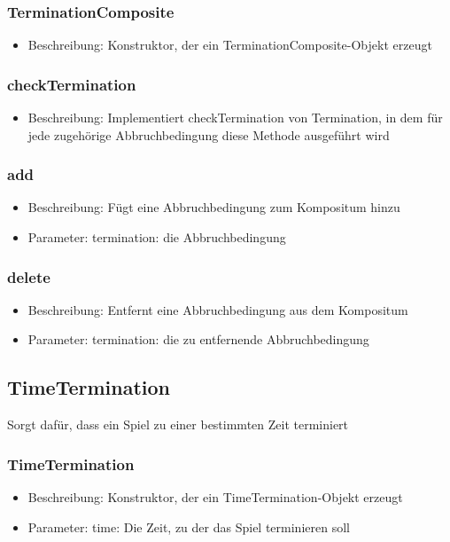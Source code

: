 \documentclass[a4paper]{scrreprt}
\begin{document}
    \subsubsection{TerminationComposite}
    \begin{itemize}
        \item Beschreibung: Konstruktor, der ein TerminationComposite-Objekt erzeugt
    \end{itemize}
    \subsubsection{checkTermination}
    \begin{itemize}
        \item Beschreibung: Implementiert checkTermination von Termination, in dem für jede zugehörige Abbruchbedingung diese Methode ausgeführt wird
    \end{itemize}
    \subsubsection{add}
    \begin{itemize}
        \item Beschreibung: Fügt eine Abbruchbedingung zum Kompositum hinzu
        \item Parameter: termination: die Abbruchbedingung
    \end{itemize}
    \subsubsection{delete}
    \begin{itemize}
        \item Beschreibung: Entfernt eine Abbruchbedingung aus dem Kompositum
        \item Parameter: termination: die zu entfernende Abbruchbedingung
    \end{itemize}


    \subsection{TimeTermination}
    Sorgt dafür, dass ein Spiel zu einer bestimmten Zeit terminiert
    \subsubsection{TimeTermination}
    \begin{itemize}
        \item Beschreibung: Konstruktor, der ein TimeTermination-Objekt erzeugt
        \item Parameter: time: Die Zeit, zu der das Spiel terminieren soll
    \end{itemize}
\end{document}
